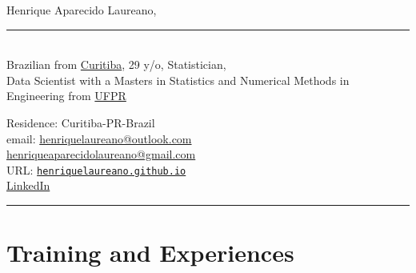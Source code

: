 \documentclass[12pt]{article}
\newcommand{\horrule}[1]{\noindent\rule{\linewidth}{#1}}
\begin{document}
\noindent
\begin{minipage}[t]{.565\textwidth}
 \raggedright
 \large Henrique Aparecido Laureano,
 \noindent\rule{.89\linewidth}{1pt}\\
 \normalsize Brazilian from
 \href{https://goo.gl/K1Qcdv}{\color{blue}Curitiba}, 29 y/o,
 Statistician,\\Data Scientist with a Masters in Statistics and
 Numerical Methods in Engineering from 
 \href{https://goo.gl/DtVAbi}{\color{blue}UFPR}
\end{minipage}%
\begin{minipage}[t]{.435\textwidth}
 \raggedright
 Residence: Curitiba-PR-Brazil\\
 email:
 \href{mailto:henriquelaureano@outlook.com}{\color{blue}
   henriquelaureano@outlook.com}\\
 \hspace{1.2cm}
 \href{mailto:henriqueaparecidolaureano@gmail.com}{\color{blue}
   henriqueaparecidolaureano@gmail.com}\\
 URL:
 \href{https://henriquelaureano.github.io/}{
  \color{blue}\texttt{henriquelaureano.github.io}}\\
 \href{https://www.linkedin.com/in/henrique-laureano-025328179}{
  \color{blue}LinkedIn}
\end{minipage}

\vspace{0.5cm}
\horrule{1pt}

\vspace{-0.25cm}
\section*{Training and Experiences}
\end{document}
